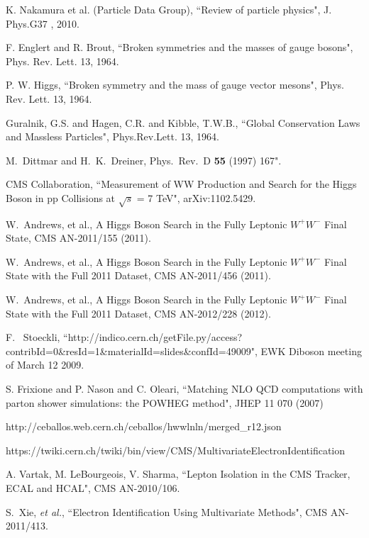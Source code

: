 \clearpage

\vspace*{-0.2cm}

 K. Nakamura et al. (Particle Data Group), ``Review of particle physics", J. Phys.G37 , 2010.

F. Englert and R. Brout, ``Broken symmetries and the masses of gauge bosons", Phys. Rev. Lett. 13,  1964.

P. W. Higgs, ``Broken symmetry and the mass of gauge vector mesons", Phys. Rev. Lett. 13, 1964.

Guralnik, G.S. and Hagen, C.R. and Kibble, T.W.B., ``Global Conservation Laws and Massless Particles", 
Phys.Rev.Lett. 13, 1964.

M.~Dittmar and H.~K.~Dreiner, Phys.\ Rev.\  D {\bf 55} (1997) 167".

CMS Collaboration, ``Measurement of WW Production and Search for the Higgs Boson in 
pp Collisions at $\sqrt{s}$ = 7 TeV", arXiv:1102.5429.

W.~Andrews, et al., A Higgs Boson Search in the Fully Leptonic $W^+W^-$ Final State, CMS AN-2011/155 (2011).

W.~Andrews, et al., A Higgs Boson Search in the Fully Leptonic $W^+W^-$ Final State with the Full 2011 Dataset, CMS AN-2011/456 (2011).

W.~Andrews, et al., A Higgs Boson Search in the Fully Leptonic $W^+W^-$ Final State with the Full 2011 Dataset, CMS AN-2012/228 (2012).

F.~ Stoeckli, ``http://indico.cern.ch/getFile.py/access?contribId=0\&resId=1\&materialId=slides\&confId=49009", 
EWK Diboson meeting of March 12 2009.

S. Frixione and P. Nason and C. Oleari, 
``Matching {NLO QCD} computations with parton shower simulations: the {POWHEG} method",
  JHEP 11 070 (2007)

http://ceballos.web.cern.ch/ceballos/hwwlnln/merged\_r12.json

https://twiki.cern.ch/twiki/bin/view/CMS/MultivariateElectronIdentification

A. Vartak, M. LeBourgeois, V. Sharma, ``Lepton Isolation in the CMS Tracker, ECAL and HCAL", CMS AN-2010/106.

S.~Xie, \textit{et al.}, ``Electron Identification Using Multivariate Methods", 
CMS AN-2011/413.

